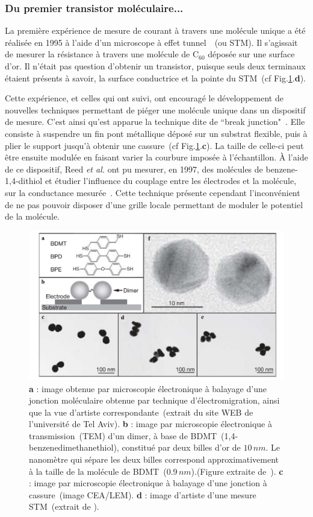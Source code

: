 \subsubsection*{Du premier transistor moléculaire...}
La première expérience de mesure de courant à travers une molécule unique a été réalisée en 1995 à l'aide d'un microscope à effet tunnel~\cite{Joachim1995}~(ou STM). Il s'agissait de mesurer la résistance à travers une molécule de C$_{60}$ déposée sur une surface d'or. Il n'était pas question d'obtenir un transistor, puisque seuls deux terminaux étaient présents à savoir, la surface conductrice et la pointe du STM~(cf Fig.\ref{MolSpintro2}.\textbf{d}).

Cette expérience, et celles qui ont suivi, ont encouragé le développement de nouvelles techniques permettant de piéger une molécule unique dans un dispositif de mesure. C'est ainsi qu'est apparue la technique dite de ``break junction"~\cite{Zhou1995}. Elle consiste à suspendre un fin pont métallique déposé sur un substrat flexible, puis à plier le support jusqu'à obtenir une cassure~(cf Fig.\ref{MolSpintro2}.\textbf{c}). La taille de celle-ci peut être ensuite modulée en faisant varier la courbure imposée à l'échantillon. À l'aide de ce dispositif, Reed \textit{et al.} ont pu mesurer, en 1997, des molécules de benzene-1,4-dithiol et étudier l'influence du couplage entre les électrodes et la molécule, sur la conductance mesurée~\cite{Reed1997}. Cette technique présente cependant l'inconvénient de ne pas pouvoir disposer d'une grille locale permettant de moduler le potentiel de la molécule.

\begin{figure}
\centering \includegraphics[scale=0.45]{Spintronique/MolSpintro2/MolSpintro2.pdf}
\caption{\textbf{a} : image obtenue par microscopie électronique à balayage d'une jonction moléculaire obtenue par technique d'électromigration, ainsi que la vue d'artiste correspondante~(extrait du site WEB de l'université de Tel Aviv). \textbf{b} : image par microscopie électronique à transmission~(TEM) d'un dimer, à base de BDMT~(1,4-
benzenedimethanethiol), constitué par deux billes d'or de $10\,nm$. Le nanomètre qui sépare les deux billes correspond approximativement à la taille de la molécule de BDMT~($0.9\,nm$).(Figure extraite de~\cite{Dadosh2005}). \textbf{c} : image par microscopie électronique à balayage d'une jonction à cassure~(image CEA/LEM). \textbf{d} : image d'artiste d'une mesure STM~(extrait de \cite{Leary2011}).}
\label{MolSpintro2}
\end{figure}


